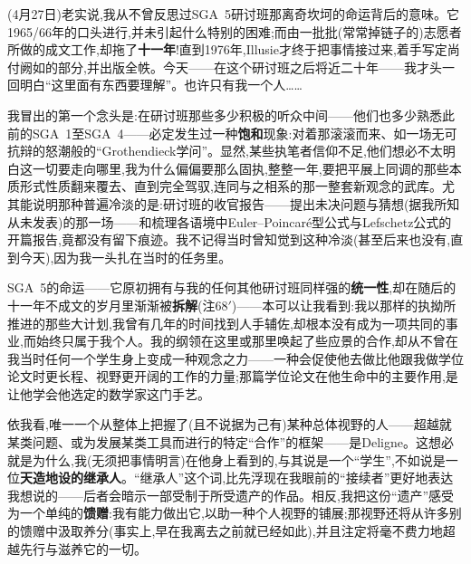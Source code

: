 
(4月27日)老实说,我从不曾反思过SGA~5研讨班那离奇坎坷的命运背后的意味。它1965/66年的口头进行,并未引起什么特别的困难;而由一批批(常常掉链子的)志愿者所做的成文工作,却拖了\textbf{十一年}!直到1976年,Illusie才终于把事情接过来,着手写定尚付阙如的部分,并出版全帙。今天——在这个研讨班之后将近二十年——我才头一回明白“这里面有东西要理解”。也许只有我一个人……

我冒出的第一个念头是:在研讨班那些多少积极的听众中间——他们也多少熟悉此前的SGA~1至SGA~4——必定发生过一种\textbf{饱和}现象:对着那滚滚而来、如一场无可抗辩的怒潮般的“Grothendieck学问”。显然,某些执笔者信仰不足,他们想必不太明白这一切要走向哪里,我为什么偏偏要那么固执,整整一年,要把平展上同调的那些\dmark{}本质形式性质翻来覆去、直到完全驾驭,连同与之相系的那一整套新观念的武库。尤其能说明那种普遍冷淡的是:研讨班的收官报告——提出未决问题与猜想(据我所知从未发表)的那一场——和梳理各语境中Euler--Poincaré型公式与Lefschetz公式的开篇报告,竟都没有留下痕迹。我不记得当时曾知觉到这种冷淡(甚至后来也没有,直到今天),因为我一头扎在当时的任务里。

SGA~5的命运——它原初拥有与我的任何其他研讨班同样强的\textbf{统一性},却在随后的十一年不成文的岁月里渐渐被\textbf{拆解}(注68$'$)——本可以让我看到:我以那样的执拗所推进的那些大计划,我曾有几年的时间找到人手辅佐,却根本没有成为一项共同的事业,而始终只属于我个人。我的纲领在这里或那里唤起了些应景的合作,却从不曾在我当时任何一个学生身上变成一种观念之力——一种会促使他去做比他跟我做学位论文时更长程、视野更开阔的工作的力量;那篇学位论文在他生命中的主要作用,是让他学会他选定的数学家这门手艺。

依我看,唯一一个从整体上把握了(且不说据为己有)某种总体视野的人——超越就某类问题、或为发展某类工具而进行的特定“合作”的框架——是Deligne。这想必就是为什么,我(无须把事情明言)在他身上看到的,与其说是一个“学生”,不如说是一位\textbf{天造地设的继承人}。“继承人”这个词,比先浮现在我眼前的“接续者”更好地表达我想说的——后者会暗示一部受制于所受遗产的作品。相反,我把这份“遗产”感受为一个单纯的\textbf{馈赠}:我有能力做出它\dmark{},以助一种个人视野的铺展;那视野还将从许多别的馈赠中汲取养分(事实上,早在我离去之前就已经如此),并且注定将毫不费力地超越先行与滋养它的一切。

